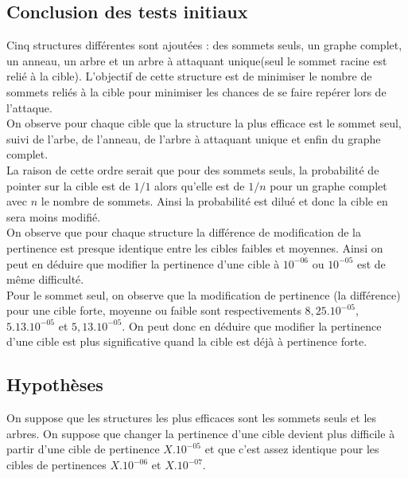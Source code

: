 \documentclass[a4paper,11pt]{article}
\begin{document}
	\subsection{Conclusion des tests initiaux}
		Cinq structures différentes sont ajoutées : des sommets seuls, un graphe complet, un anneau, un arbre et un arbre à attaquant unique(seul le sommet racine est relié à la cible). L'objectif de cette structure est de minimiser le nombre de sommets reliés à la cible pour minimiser les chances de se faire repérer lors de l'attaque.\\
		On observe pour chaque cible que la structure la plus efficace est le sommet seul, suivi de l'arbe, de l'anneau, de l'arbre à attaquant unique et enfin du graphe complet.\\
		La raison de cette ordre serait que pour des sommets seuls, la probabilité de pointer sur la cible est de $1/1$ alors qu'elle est de $1/n$ pour un graphe complet avec $n$ le nombre de sommets. Ainsi la probabilité est dilué et donc la cible en sera moins modifié.\\
		On observe que pour chaque structure la différence de modification de la pertinence est presque identique entre les cibles faibles et moyennes.
		Ainsi on peut en déduire que modifier la pertinence d'une cible à $10^{-06}$ ou $10^{-05}$ est de même difficulté.\\		
		Pour le sommet seul, on observe que la modification de pertinence (la différence) pour une cible forte, moyenne ou faible sont respectivements $8,25.10^{-05}$, $5.13.10^{-05}$ et $5,13.10^{-05}$. On peut donc en déduire que modifier la pertinence d'une cible est plus significative quand la cible est déjà à pertinence forte.
			
	\subsection{Hypothèses}
		On suppose que les structures les plus efficaces sont les sommets seuls et les arbres. On suppose que changer la pertinence d'une cible devient 
		plus difficile à partir d'une cible de pertinence $X.10^{-05}$ et que c'est assez identique pour les cibles de pertinences $X.10^{-06}$ et $X.10^{-07}$.
\end{document}
